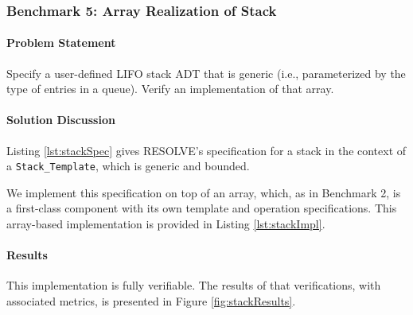 		\subsubsection{Benchmark 5: Array Realization of Stack}	%

\paragraph{Problem Statement}Specify a user-defined LIFO stack ADT that is generic (i.e., parameterized by the type of entries in a queue). Verify an implementation of that array.

\paragraph{Solution Discussion}Listing \ref{lst:stackSpec} gives RESOLVE's specification for a stack in the context of a \texttt{Stack\_Template}, which is generic and bounded.



We implement this specification on top of an array, which, as in Benchmark 2, is a first-class component with its own template and operation specifications.  This array-based implementation is provided in Listing \ref{lst:stackImpl}.



\paragraph{Results}This implementation is fully verifiable.  The results of that verifications, with associated metrics, is presented in Figure \ref{fig:stackResults}.

